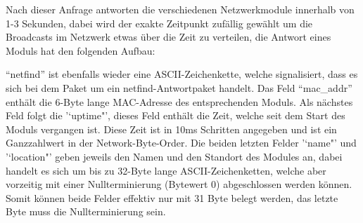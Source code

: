 \documentclass[a4paper,14pt,headsepline]{scrartcl}
\begin{document}
\newpage

Nach dieser Anfrage antworten die verschiedenen Netzwerkmodule innerhalb von 1-3 Sekunden, dabei wird der exakte Zeitpunkt zufällig gewählt um die Broadcasts im Netzwerk etwas über die Zeit zu verteilen, die Antwort eines Moduls hat den folgenden Aufbau:
\begin{figure}[h]
\begin{center}
\end{center}
\end{figure}

\newpage

"`netfind"' ist ebenfalls wieder eine ASCII-Zeichenkette, welche signalisiert, dass es sich bei dem Paket um ein netfind-Antwortpaket handelt. Das Feld "`mac\_addr"' enthält die 6-Byte lange MAC-Adresse des entsprechenden Moduls. Als nächstes Feld folgt die '`uptime"', dieses Feld enthält die Zeit, welche seit dem Start des Moduls vergangen ist. Diese Zeit ist in 10ms Schritten angegeben und ist ein Ganzzahlwert in der Network-Byte-Order. Die beiden letzten Felder '`name"' und '`location"' geben jeweils den Namen und den Standort des Modules an, dabei handelt es sich um bis zu 32-Byte lange ASCII-Zeichenketten, welche aber vorzeitig mit einer Nullterminierung (Bytewert 0) abgeschlossen werden können. Somit können beide Felder effektiv nur mit 31 Byte belegt werden, das letzte Byte muss die Nullterminierung sein.
\end{document}
